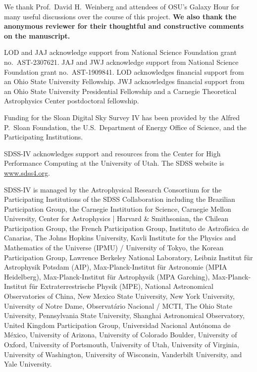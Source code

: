 \documentclass[twocolumn,twocolappendix,linenumbers]{aastex631}
\begin{document}
We thank Prof.\ David H.\ Weinberg and attendees of OSU's Galaxy Hour for many useful discussions over the course of this project. {\bf We also thank the anonymous reviewer for their thoughtful and constructive comments on the manuscript.}

LOD and JAJ acknowledge support from National Science Foundation grant no.\ AST-2307621. JAJ and JWJ acknowledge support from National Science Foundation grant no.\ AST-1909841.
LOD acknowledges financial support from an Ohio State University Fellowship.
JWJ acknowledges financial support from an Ohio State University Presidential Fellowship and a Carnegie Theoretical Astrophysics Center postdoctoral fellowship.

Funding for the Sloan Digital Sky 
Survey IV has been provided by the 
Alfred P.\ Sloan Foundation, the U.S.\ 
Department of Energy Office of 
Science, and the Participating 
Institutions. 

SDSS-IV acknowledges support and 
resources from the Center for High 
Performance Computing  at the 
University of Utah. The SDSS 
website is \url{www.sdss4.org}.

SDSS-IV is managed by the 
Astrophysical Research Consortium 
for the Participating Institutions 
of the SDSS Collaboration including 
the Brazilian Participation Group, 
the Carnegie Institution for Science, 
Carnegie Mellon University, Center for 
Astrophysics | Harvard \& 
Smithsonian, the Chilean Participation 
Group, the French Participation Group, 
Instituto de Astrof\'isica de 
Canarias, The Johns Hopkins 
University, Kavli Institute for the 
Physics and Mathematics of the 
Universe (IPMU) / University of 
Tokyo, the Korean Participation Group, 
Lawrence Berkeley National Laboratory, 
Leibniz Institut f\"ur Astrophysik 
Potsdam (AIP),  Max-Planck-Institut 
f\"ur Astronomie (MPIA Heidelberg), 
Max-Planck-Institut f\"ur 
Astrophysik (MPA Garching), 
Max-Planck-Institut f\"ur 
Extraterrestrische Physik (MPE), 
National Astronomical Observatories of 
China, New Mexico State University, 
New York University, University of 
Notre Dame, Observat\'ario 
Nacional / MCTI, The Ohio State 
University, Pennsylvania State 
University, Shanghai 
Astronomical Observatory, United 
Kingdom Participation Group, 
Universidad Nacional Aut\'onoma 
de M\'exico, University of Arizona, 
University of Colorado Boulder, 
University of Oxford, University of 
Portsmouth, University of Utah, 
University of Virginia, University 
of Washington, University of 
Wisconsin, Vanderbilt University, 
and Yale University.
\end{document}
